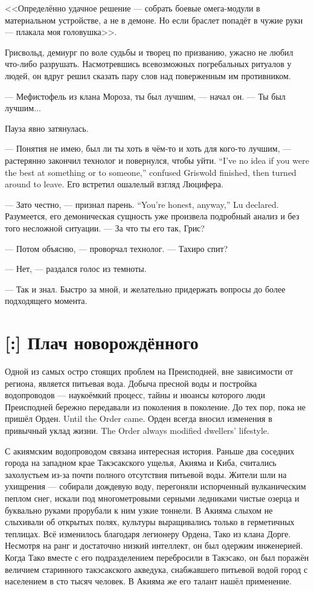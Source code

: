 <<Определённо удачное решение --- собрать боевые омега-модули в материальном устройстве, а не в демоне.
Но если браслет попадёт в чужие руки --- плакала моя головушка>>.

Грисвольд, демиург по воле судьбы и творец по призванию, ужасно не любил что-либо разрушать.
Насмотревшись всевозможных погребальных ритуалов у людей, он вдруг решил сказать пару слов над поверженным им противником.

--- Мефистофель из клана Мороза, ты был лучшим, --- начал он.
--- Ты был лучшим...

Пауза явно затянулась.

{--- Понятия не имею, был ли ты хоть в чём-то и хоть для кого-то лучшим, --- растерянно закончил технолог и повернулся, чтобы уйти.}
{``I've no idea if you were the best at something or to someone,'' confused Griswold finished, then turned around to leave.}
Его встретил ошалелый взгляд Люцифера.

{--- Зато честно, --- признал парень.}
{``You're honest, anyway,'' Lu declared.}
Разумеется, его демоническая сущность уже произвела подробный анализ и без того несложной ситуации.
--- За что ты его так, Грис?

--- Потом объясню, --- проворчал технолог.
--- Тахиро спит?

--- Нет, --- раздался голос из темноты.

--- Так и знал.
Быстро за мной, и желательно придержать вопросы до более подходящего момента.

\section{[:] Плач новорождённого}

Одной из самых остро стоящих проблем на Преисподней, вне зависимости от региона, является питьевая вода.
Добыча пресной воды и постройка водопроводов --- наукоёмкий процесс, тайны и нюансы которого люди Преисподней бережно передавали из поколения в поколение.
{До тех пор, пока не пришёл Орден.}
{Until the Order came.}
{Орден всегда вносил изменения в привычный уклад жизни.}
{The Order always modified dwellers' lifestyle.}

С акиямским водопроводом связана интересная история.
Раньше два соседних города на западном крае Такэсакского ущелья, Акияма и Киба, считались захолустьем из-за почти полного отсутствия питьевой воды.
Жители шли на ухищрения --- собирали дождевую воду, перегоняли испорченный вулканическим пеплом снег, искали под многометровыми серными ледниками чистые озерца и буквально руками прорубали к ним узкие тоннели.
В Акияма слыхом не слыхивали об открытых полях, культуры выращивались только в герметичных теплицах.
Всё изменилось благодаря легионеру Ордена, Тако из клана Дорге.
Несмотря на ранг и достаточно низкий интеллект, он был одержим инженерией.
Когда Тако вместе с его подразделением перебросили в Такэсако, он был поражён величием старинного такэсакского акведука, снабжавшего питьевой водой город с населением в сто тысяч человек.
В Акияма же его талант нашёл применение.

